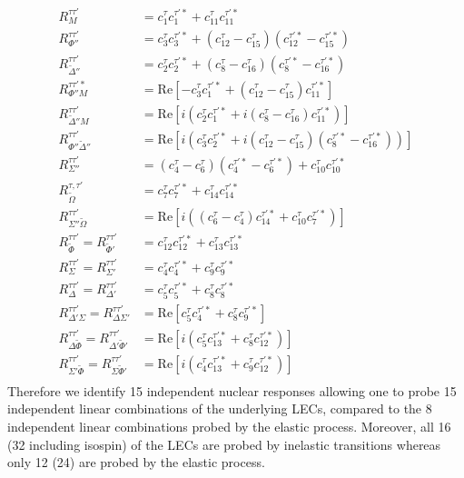 \documentclass{book}[12pt]
\begin{document}
\begin{equation}
\begin{split}
R_M^{\tau\tau'}&=c_1^{\tau}c_1^{\tau'*}+c_{11}^{\tau}c_{11}^{\tau'*}\\
R_{\Phi''}^{\tau\tau'}&=c_3^{\tau}c_3^{\tau'*}+(c_{12}^{\tau}-c_{15}^{\tau})(c_{12}^{\tau'*}-c_{15}^{\tau'*})\\
R_{\tilde{\Delta}''}^{\tau\tau'}&=c_2^{\tau}c_2^{\tau'*}+(c_8^{\tau}-c_{16}^{\tau})(c_8^{\tau'*}-c_{16}^{\tau'*})\\
R_{\Phi''M}^{\tau\tau'*}&=\mathrm{Re}\left[-c_3^{\tau}c_1^{\tau'*}+(c_{12}^{\tau}-c_{15}^{\tau})c_{11}^{\tau'*}\right]\\
R_{\tilde{\Delta}''M}^{\tau\tau'}&=\mathrm{Re}\left[i\left(c_2^{\tau}c_1^{\tau'*}+i(c_8^{\tau}-c_{16}^{\tau})c_{11}^{\tau'*}\right)\right]\\
R_{\Phi''\tilde{\Delta}''}^{\tau\tau'}&=\mathrm{Re}\left[i\left(c_3^{\tau}c_2^{\tau'*}+i(c_{12}^{\tau}-c_{15}^{\tau})(c_8^{\tau'*}-c_{16}^{\tau'*})\right)\right]\\
R_{\Sigma''}^{\tau\tau'}&=(c_4^{\tau}-c_6^{\tau})(c_4^{\tau'*}-c_6^{\tau'*})+c_{10}^{\tau}c_{10}^{\tau'*}\\
R_{\tilde{\Omega}}^{\tau,\tau'}&=c_7^{\tau}c_7^{\tau'*}+c_{14}^{\tau}c_{14}^{\tau'*}\\
R_{\Sigma''\tilde{\Omega}}^{\tau\tau'}&=\mathrm{Re}\left[i\left((c_6^{\tau}-c_4^{\tau})c_{14}^{\tau'*}+c_{10}^{\tau}c_7^{\tau'*}\right)\right]\\
R_{\tilde{\Phi}}^{\tau\tau'}=R_{\tilde{\Phi}'}^{\tau\tau'}&=c_{12}^{\tau}c_{12}^{\tau'*}+c_{13}^{\tau}c_{13}^{\tau'*}\\
R_{\Sigma}^{\tau\tau'}=R_{\Sigma'}^{\tau\tau'}&=c_4^{\tau}c_4^{\tau'*}+c_9^{\tau}c_9^{\tau'*}\\
R_{\Delta}^{\tau\tau'}=R_{\Delta'}^{\tau\tau'}&=c_5^{\tau}c_5^{\tau'*}+c_8^{\tau}c_8^{\tau'*}\\
R_{\Delta'\Sigma}^{\tau\tau'}=R_{\Delta\Sigma'}^{\tau\tau'}&=\mathrm{Re}\left[c_5^{\tau}c_4^{\tau'*}+c_8^{\tau}c_9^{\tau'*}\right]\\
R_{\Delta\tilde{\Phi}}^{\tau\tau'}=R_{\Delta'\tilde{\Phi}'}^{\tau\tau'}&=\mathrm{Re}\left[i\left(c_5^{\tau}c_{13}^{\tau'*}+c_8^{\tau}c_{12}^{\tau'*}\right)\right]\\
R_{\Sigma'\tilde{\Phi}}^{\tau\tau'}=R_{\Sigma\tilde{\Phi}'}^{\tau\tau'}&=\mathrm{Re}\left[i\left(c_4^{\tau}c_{13}^{\tau'*}+c_9^{\tau}c_{12}^{\tau'*}\right)\right]\\
\end{split}
\end{equation}
Therefore we identify 15 independent nuclear responses allowing one to probe 15 independent linear combinations of the underlying LECs, compared to the 8 independent linear combinations probed by the elastic process. Moreover, all 16 (32 including isospin) of the LECs are probed by inelastic transitions whereas only 12 (24) are probed by the elastic process.
\end{document}

